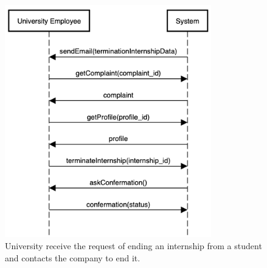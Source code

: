     \begin{figure}[H]
        \centering
        \includegraphics[width=0.8\textwidth]{RASD/Assets/SequenceDiagrams/8-student-end-internship.png}
        \caption{University receive the request of ending an internship from a student and contacts the company to end it.}
        \label{fig:University receive the request of ending an internship from a student and contact the company to end it}
    \end{figure}


